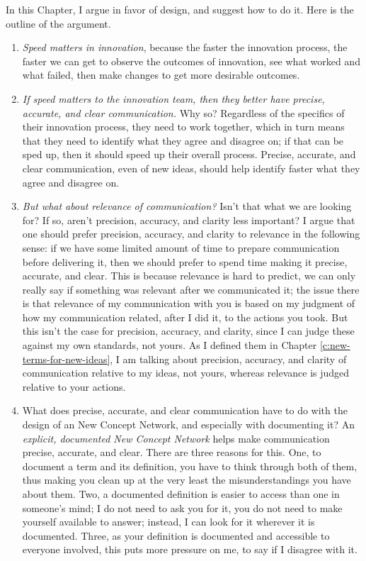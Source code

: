 \documentclass[graybox,envcountchap,sectrefs]{svmono}
\newcommand{\ncnf}{New Concept Network}
\begin{document}
In this Chapter, I argue in favor of design, and suggest how to do it. Here is the outline of the argument.
\begin{enumerate}
	\item \textit{Speed matters in innovation}, because the faster the innovation process, the faster we can get to observe the outcomes of innovation, see what worked and what failed, then make changes to get more desirable outcomes.
	\item \textit{If speed matters to the innovation team, then they better have precise, accurate, and clear communication.} Why so? Regardless of the specifics of their innovation process, they need to work together, which in turn means that they need to identify what they agree and disagree on; if that can be sped up, then it should speed up their overall process. Precise, accurate, and clear communication, even of new ideas, should help identify faster what they agree and disagree on.
	\item \textit{But what about relevance of communication?} Isn't that what we are looking for? If so, aren't precision, accuracy, and clarity less important? I argue that one should prefer precision, accuracy, and clarity to relevance in the following sense: if we have some limited amount of time to prepare communication before delivering it, then we should prefer to spend time making it precise, accurate, and clear. This is because relevance is hard to predict, we can only really say if something was relevant after we communicated it; the issue there is that relevance of my communication with you is based on my judgment of how my communication related, after I did it, to the actions you took. But this isn't the case for precision, accuracy, and clarity, since I can judge these against my own standards, not yours. As I defined them in Chapter \ref{c:new-terms-for-new-ideas}, I am talking about precision, accuracy, and clarity of communication relative to my ideas, not yours, whereas relevance is judged relative to your actions.
	\item What does precise, accurate, and clear communication have to do with the design of an \ncnf, and especially with documenting it? An \textit{explicit, documented \ncnf{}} helps make communication precise, accurate, and clear. There are three reasons for this. One, to document a term and its definition, you have to think through both of them, thus making you clean up at the very least the misunderstandings you have about them. Two, a documented definition is easier to access than one in someone's mind; I do not need to ask you for it, you do not need to make yourself available to answer; instead, I can look for it wherever it is documented. Three, as your definition is documented and accessible to everyone involved, this puts more pressure on me, to say if I disagree with it.

\end{enumerate}
\end{document}
